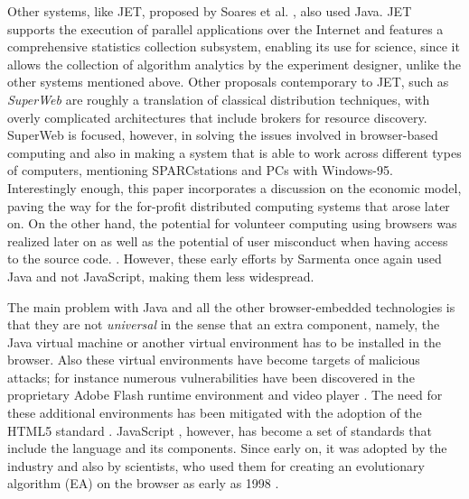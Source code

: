 \documentclass[journal,onecolumn]{IEEEtran}
\begin{document}
Other systems, like JET, proposed by Soares et
al. \cite{soares1998get}, also used Java. JET supports
the execution of parallel applications over the Internet and features
a comprehensive statistics collection subsystem, enabling its use for science, %
since it allows %
the collection of algorithm analytics by the
experiment designer, unlike the other systems mentioned
above. Other proposals contemporary to JET, such as {\em SuperWeb}
\cite{alexandrov1997superweb} are roughly a translation of classical
distribution techniques, with overly complicated architectures that include
brokers for resource discovery. SuperWeb is focused,
however, in solving the
issues involved in browser-based computing and also in making a system
that is able to work across different types of computers, mentioning
SPARCstations and PCs with Windows-95. Interestingly enough, this
paper incorporates a discussion on the economic model, paving the way
for the for-profit distributed computing systems that arose later on. 
On the other hand, the potential for volunteer computing using
browsers was realized
later on \cite{sarmenta-bayanihan} as well as the potential of
user misconduct when having access to the source code.
\cite{sarmenta-sabotagetolerance}. However, these early efforts by
Sarmenta once again used Java and not JavaScript, making them %
less widespread.

The main problem with Java and all the other browser-embedded
technologies is that they are not {\em universal} in the
sense that an extra component, namely, the Java virtual machine or another
virtual environment has to be installed in the browser.
Also these virtual environments have become targets of malicious attacks; 
for instance numerous vulnerabilities have been discovered in 
the proprietary Adobe Flash runtime environment and
video player \cite{ford2009analyzing,watanabe2010new}. The need for
these additional environments has been mitigated with the
adoption of the HTML5 standard \cite{anthes2012html5}.
JavaScript \cite{flanagan2006javascript}, however, has become a set of standards
\cite{ECMA-262} that include the language and its components. Since
early on, it was adopted by the industry and also by scientists,
who used them for creating an evolutionary algorithm (EA) on
the browser as early as 1998 \cite{jj-ppsn98}.
\end{document}
